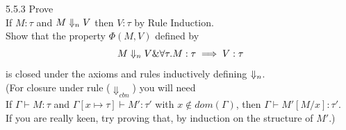 \begin{exercise}{5.5.3}
Prove
\\
If $M: \tau$ and $ M\Downarrow_n V $ then $V : \tau$ by Rule Induction. 
\\
Show that the property $\Phi(M,V)$ defined by
\[M \Downarrow_n V \& \forall \tau.M : \tau \implies V : \tau\]
is closed under the axioms and rules inductively defining $\Downarrow_n$. \\(For closure under rule ($\Downarrow_{cbn}$) you will need 
\\
If $\Gamma \vdash M : \tau $ and $\Gamma[x \mapsto \tau] \vdash M' : \tau' $ with $x \notin dom(\Gamma)$, then $\Gamma \vdash M'[M/x]:\tau'$.
\\
If you are really keen, try proving that, by induction on the structure of $M'$.)
\end{exercise}

